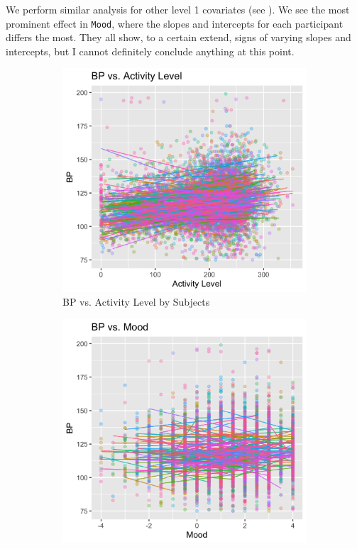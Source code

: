 \documentclass[12pt,twoside,letterpaper]{article}
\theoremstyle{definition}
\theoremstyle{definition}
\begin{document}
We perform similar analysis for other level 1 covariates (see ). We see the most prominent effect in \texttt{Mood}, where the slopes and intercepts for each participant differs the most. They all show, to a certain extend, signs of varying slopes and intercepts, but I cannot definitely conclude anything at this point.

\begin{figure} 
    \centering
    \begin{subfigure}[b]{0.32\textwidth}
    \centering
    \includegraphics[width=\textwidth]{pics/bp v act.png}
    \caption[]%
    {{\small BP vs. Activity Level by Subjects}}
    \label{fig: bp v act}
    \end{subfigure}
    \hfill
    \begin{subfigure}[b]{0.32\textwidth}
    \centering
    \includegraphics[width=\textwidth]{pics/bp v mood.png}

\end{subfigure}
\end{figure}
\end{document}
